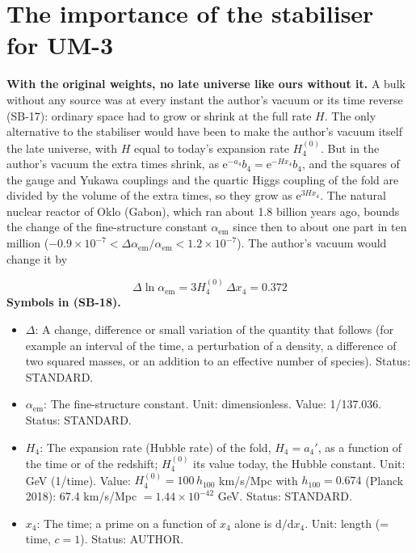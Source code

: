 \documentclass[
  10pt,
]{article}
\providecommand{\tightlist}{%
  \setlength{\itemsep}{0pt}\setlength{\parskip}{0pt}}
\begin{document}
\hypertarget{the-importance-of-the-stabiliser-for-um-3}{%
\section{The importance of the stabiliser for
UM-3}\label{the-importance-of-the-stabiliser-for-um-3}}

\textbf{With the original weights, no late universe like ours without
it.} A bulk without any source was at every instant the author's vacuum
or its time reverse (SB-17): ordinary space had to grow or shrink at the
full rate \(H\). The only alternative to the stabiliser would have been
to make the author's vacuum itself the late universe, with \(H\) equal
to today's expansion rate \(H_4^{(0)}\). But in the author's vacuum the
extra times shrink, as \(\mathrm{e}^{-a_4}b_4 = \mathrm{e}^{-Hx_4}b_4\),
and the squares of the gauge and Yukawa couplings and the quartic Higgs
coupling of the fold are divided by the volume of the extra times, so
they grow as \(\mathrm{e}^{3Hx_4}\). The natural nuclear reactor of Oklo
(Gabon), which ran about 1.8 billion years ago, bounds the change of the
fine-structure constant \(\alpha_{\mathrm{em}}\) since then to about one
part in ten million
(\(-0.9\times10^{-7} < \Delta\alpha_{\mathrm{em}}/\alpha_{\mathrm{em}} < 1.2\times10^{-7}\)).
The author's vacuum would change it by

\[
\Delta\ln\alpha_{\mathrm{em}} = 3H_4^{(0)}\,\Delta x_4 = 0.372 \tag{SB-18}
\] \textbf{Symbols in (SB-18).}

\begin{itemize}
\tightlist
\item
  \(\Delta\): A change, difference or small variation of the quantity
  that follows (for example an interval of the time, a perturbation of a
  density, a difference of two squared masses, or an addition to an
  effective number of species). Status: STANDARD.
\item
  \(\alpha_{\mathrm{em}}\): The fine-structure constant. Unit:
  dimensionless. Value: 1/137.036. Status: STANDARD.
\item
  \(H_4\): The expansion rate (Hubble rate) of the fold, \(H_4 = a_4'\),
  as a function of the time or of the redshift; \(H_4^{(0)}\) its value
  today, the Hubble constant. Unit: GeV (1/time). Value:
  \(H_4^{(0)} = 100\,h_{100}\) km/s/Mpc with \(h_{100} = 0.674\) (Planck
  2018): 67.4 km/s/Mpc \(= 1.44\times10^{-42}\) GeV. Status: STANDARD.
\item
  \(x_4\): The time; a prime on a function of \(x_4\) alone is
  \(\mathrm{d}/\mathrm{d}x_4\). Unit: length (= time, \(c = 1\)).
  Status: AUTHOR.
\end{itemize}
\end{document}
